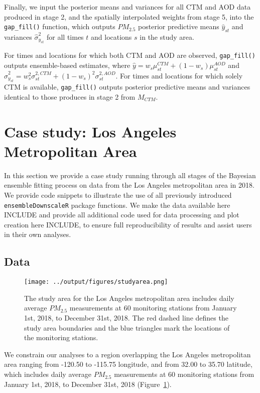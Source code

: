 \documentclass[12pt]{article}
\begin{document}
Finally, we input the posterior means and variances for all CTM and AOD data produced in stage 2, and the spatially interpolated weights from stage 5, into the \texttt{gap\_fill()} function, which outputs $PM_{2.5}$ posterior predictive means $\hat{y}_{st}$ and variances $\hat{\sigma}^{2}_{y_{st}}$ for all times $t$ and locations $s$ in the study area. 

For times and locations for which both CTM and AOD are observed, \texttt{gap\_fill()} outputs ensemble-based estimates, where $\hat{y} = w_s \mu^{CTM}_{st} + (1 - w_s)\mu^{AOD}_{st}$ and $\hat{\sigma}^2_{y_{st}} = w^2_s \sigma^{2, CTM}_{st} + (1 - w_s)^2 \sigma^{2, AOD}_{st}$. 
For times and locations for which solely CTM is available, \texttt{gap\_fill()} outputs posterior predictive means and variances identical to those produces in stage 2 from $M_{CTM}$. 



\section*{Case study: Los Angeles Metropolitan Area}

In this section we provide a case study running through all stages of the Bayesian ensemble fitting process on data from the Los Angeles metropolitan area in 2018. 
We provide code snippets to illustrate the use of all previously introduced \texttt{ensembleDownscaleR} package functions. 
We make the data available here INCLUDE and provide all additional code used for data processing and plot creation here INCLUDE, to ensure full reproducibility of results and assist users in their own analyses. 



\subsection*{Data}

\begin{figure}[ht]
    \centering
    \texttt{[image: ../output/figures/studyarea.png]}
    \caption{The study area for the Los Angeles metropolitan area includes daily average $PM_{2.5}$ measurements at 60 monitoring stations from January 1st, 2018, to December 31st, 2018. The red dashed line defines the study area boundaries and the blue triangles mark the locations of the monitoring stations.}
    \label{fig:pltstudyarea}
\end{figure}
We constrain our analyses to a region overlapping the Los Angeles metropolitan area ranging from -120.50 to -115.75 longitude, and from 32.00 to 35.70 latitude, which includes daily average $PM_{2.5}$ measurements at 60 monitoring stations from January 1st, 2018, to December 31st, 2018 (Figure~\ref{fig:pltstudyarea}).
\end{document}
